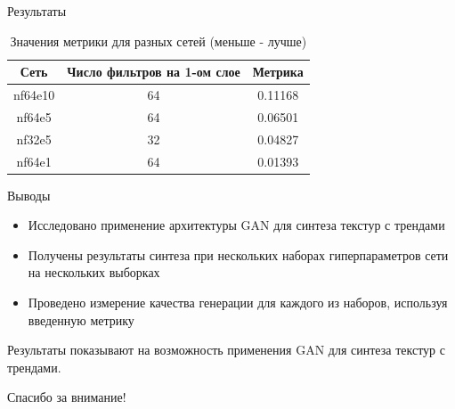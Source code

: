 \documentclass[12pt]{beamer}
\begin{document}
	\begin{frame}{Результаты}
		\begin{table}
			\begin{center}
				\begin{tabular}{|c|c|c|}
					\hline
					Сеть & Число фильтров на 1-ом слое & Метрика \\
					\hline
					nf64e10 & 64& 0.11168\\
					\hline
					nf64e5 & 64 & 0.06501\\
					\hline
					nf32e5 & 32 & 0.04827\\
					\hline
					nf64e1 & 64 & 0.01393\\
					\hline
				\end{tabular}
				\caption{Значения метрики для разных сетей (меньше - лучше)}
			\end{center}
		\end{table}
	\end{frame}
	
	\begin{frame}{Выводы}
		\begin{itemize}
			\item Исследовано применение архитектуры GAN для синтеза текстур с трендами
			\item Получены результаты синтеза при нескольких наборах гиперпараметров сети на нескольких выборках
			\item Проведено измерение качества генерации для каждого из наборов, используя введенную метрику
		\end{itemize}
		Результаты показывают на возможность применения GAN для синтеза текстур с трендами.
	\end{frame}
	
	\begin{frame}
		\centering\huge{Спасибо за внимание!}
	\end{frame}
\end{document}
